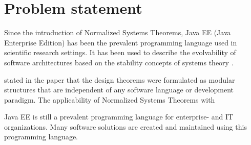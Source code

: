 \section{Problem statement} \label{problem_statement} 

Since the introduction of Normalized Systems Theorems, Java EE (Java Enterprise Edition)
has been the prevalent programming language used in scientific research settings. It has
been used to describe the evolvability of software architectures based on the stability
concepts of systems theory \parencite[]{mannaert_towards_2012}.

\citeauthor{mannaert_towards_2012} stated in the paper that the design theorems were
formulated as modular structures that are independent of any software language or
development paradigm. The applicability of Normalized Systems Theorems with

Java EE is still a prevalent programming language for enterprise- and IT organizations.
Many software solutions are created and maintained using this programming language.
